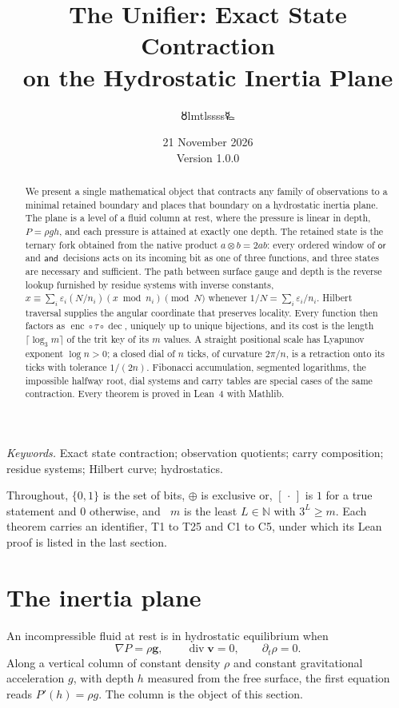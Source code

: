 \documentclass[11pt,a4paper]{article}
\title{\LARGE The Unifier: Exact State Contraction\\on the Hydrostatic Inertia Plane}
\author{{\authorsymbol 🜘}lmtlssss{\authorsymbol 🜐}}
\date{21 November 2026\\[3pt]\small Version 1.0.0}
\theoremstyle{definition}
\newcommand{\B}{\{0,1\}}
\newcommand{\xor}{\mathbin{\oplus}}
\newcommand{\ot}{\mathbin{\otimes}}
\newcommand{\sor}{\mathsf{or}\,}
\newcommand{\sand}{\mathsf{and}\,}
\DeclareMathOperator{\dec}{dec}
\DeclareMathOperator{\enc}{enc}
\DeclareMathOperator{\clog}{clog_3}
\begin{document}
\maketitle\thispagestyle{plain}
\begin{abstract}
We present a single mathematical object that contracts any family of observations to a minimal retained boundary and places that boundary on a hydrostatic inertia plane. The plane is a level of a fluid column at rest, where the pressure is linear in depth, $P=\rho gh$, and each pressure is attained at exactly one depth. The retained state is the ternary fork obtained from the native product $a\ot b=2ab$: every ordered window of $\sor$ and $\sand$ decisions acts on its incoming bit as one of three functions, and three states are necessary and sufficient. The path between surface gauge and depth is the reverse lookup furnished by residue systems with inverse constants, $x\equiv\sum_i\varepsilon_i(N/n_i)(x\bmod n_i)\pmod N$ whenever $1/N=\sum_i\varepsilon_i/n_i$. Hilbert traversal supplies the angular coordinate that preserves locality. Every function then factors as $\enc\circ\tau\circ\dec$, uniquely up to unique bijections, and its cost is the length $\lceil\log_3m\rceil$ of the trit key of its $m$ values. A straight positional scale has Lyapunov exponent $\log n>0$; a closed dial of $n$ ticks, of curvature $2\pi/n$, is a retraction onto its ticks with tolerance $1/(2n)$. Fibonacci accumulation, segmented logarithms, the impossible halfway root, dial systems and carry tables are special cases of the same contraction. Every theorem is proved in Lean~4 with Mathlib.
\end{abstract}
\noindent\textit{Keywords.} Exact state contraction; observation quotients; carry composition; residue systems; Hilbert curve; hydrostatics.

\medskip\noindent
Throughout, $\B$ is the set of bits, $\xor$ is exclusive or, $[\,\cdot\,]$ is $1$ for a true statement and $0$ otherwise, and $\clog m$ is the least $L\in\mathbb N$ with $3^L\ge m$. Each theorem carries an identifier, T1 to T25 and C1 to C5, under which its Lean proof is listed in the last section.

\section{The inertia plane}
An incompressible fluid at rest is in hydrostatic equilibrium when
\begin{equation}\label{eq:hydro}
\nabla P=\rho\mathbf g,\qquad\operatorname{div}\mathbf v=0,\qquad\partial_t\rho=0.
\end{equation}
Along a vertical column of constant density $\rho$ and constant gravitational acceleration $g$, with depth $h$ measured from the free surface, the first equation reads $P'(h)=\rho g$. The column is the object of this section.
\end{document}
